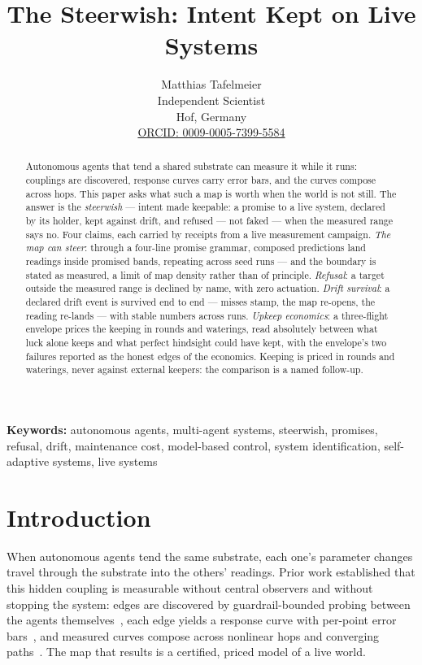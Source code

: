 \documentclass[11pt,a4paper]{article}
\title{The Steerwish: Intent Kept on Live Systems}
\author{
  Matthias Tafelmeier \\
  Independent Scientist \\
  Hof, Germany \\
  \href{https://orcid.org/0009-0005-7399-5584}{ORCID: 0009-0005-7399-5584}
}
\date{}
\begin{document}
\maketitle

\begin{abstract}
Autonomous agents that tend a shared substrate can measure it while it
runs: couplings are discovered, response curves carry error bars, and
the curves compose across hops. This paper asks what such a map is
worth when the world is not still. The answer is the \emph{steerwish}
--- intent made keepable: a promise to a live system, declared by its
holder, kept against drift, and refused --- not faked --- when the
measured range says no. Four claims, each carried by receipts
from a live measurement campaign. \emph{The map can steer}: through a
four-line promise grammar, composed predictions land readings inside
promised bands, repeating across seed runs --- and the boundary is
stated as measured, a limit of map density rather than of principle.
\emph{Refusal}: a target outside the measured range is declined by
name, with zero actuation. \emph{Drift survival}: a declared drift
event is survived end to end --- misses stamp, the map re-opens, the
reading re-lands --- with stable numbers across runs. \emph{Upkeep
economics}: a three-flight envelope prices the keeping in rounds and
waterings, read absolutely between what luck alone keeps and what
perfect hindsight could have kept, with the envelope's two failures
reported as the honest edges of the economics. Keeping is
priced in rounds and waterings, never against external keepers: the
comparison is a named follow-up.
\end{abstract}

\noindent\textbf{Keywords:} autonomous agents, multi-agent systems,
steerwish, promises, refusal, drift, maintenance cost, model-based
control, system identification, self-adaptive systems, live systems

\section{Introduction}
\label{sec:intro}

When autonomous agents tend the same substrate, each one's parameter
changes travel through the substrate into the others' readings. Prior
work established that this hidden coupling is measurable without
central observers and without stopping the system: edges are
discovered by guardrail-bounded probing between the agents
themselves~\cite{p1}, each edge yields a response curve with per-point
error bars~\cite{p2}, and measured curves compose across nonlinear
hops and converging paths~\cite{p3}. The map that results is a
certified, priced model of a live world.
\end{document}
